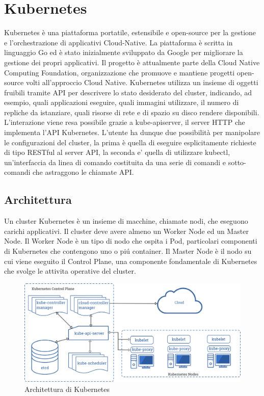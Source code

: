 
\section{Kubernetes}
Kubernetes è una piattaforma portatile, estensibile e open-source per la gestione e l'orchestrazione di applicativi Cloud-Native.
La piattaforma è scritta in linguaggio Go ed è stato inizialmente sviluppato da Google per migliorare la gestione dei propri applicativi. Il progetto è attualmente parte della Cloud Native Computing Foundation, organizzazione che promuove e mantiene progetti open-source volti all'approccio Cloud Native.
Kubernetes utilizza un insieme di oggetti fruibili tramite API per descrivere lo stato desiderato del cluster, indicando, ad esempio, quali applicazioni eseguire, quali immagini utilizzare, il numero di repliche da istanziare, quali risorse di rete e di spazio su disco rendere disponibili. L'interazione viene resa possibile grazie a kube-apiserver, il server HTTP che implementa l'API Kubernetes. L'utente ha dunque due possibilità per manipolare le configurazioni del cluster, la prima è quella di eseguire esplicitamente richieste di tipo RESTful al server API, la seconda e' quella di utilizzare kubectl, un'interfaccia da linea di comando costituita da una serie di comandi e sotto-comandi che astraggono le chiamate API.
\subsection{Architettura}
Un cluster Kubernetes è un insieme di macchine, chiamate nodi, che eseguono carichi applicativi. Il cluster deve avere almeno un Worker Node ed un Master Node. Il Worker Node è un tipo di nodo che ospita i Pod, particolari componenti di Kubernetes che contengono uno o piú container. Il Master Node è il nodo su cui viene eseguito il Control Plane, una componente fondamentale di Kubernetes che svolge le attivita operative del cluster.

\begin{figure}[H]
 \centering
 \includegraphics[width=1.0\textwidth]{./Figure/Kubernetes_Architettura.png}
 \caption{Architettura di Kubernetes}
 \label{fig:Architettura}
\end{figure}

